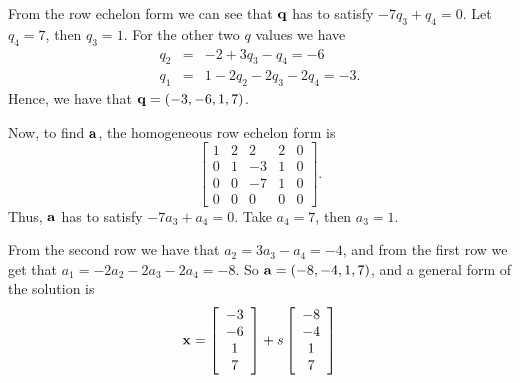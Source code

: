 From the row echelon form we can see that $\qq$ has to satisfy $- 7q_3 + q_4 = 0$. Let $q_4 = 7$, then $q_3 = 1$. For the other two $q$ values we have
\begin{eqnarray*}
  q_2 &=& -2 + 3q_3 - q_4 = -6 \\
	q_1 &=& 1 - 2q_2 - 2q_3 - 2q_4 = -3.
\end{eqnarray*}
Hence, we have that $\qq = (-3, -6, 1, 7)$.

Now, to find $\aa$, the homogeneous row echelon form is
$$
\left[\begin{array}{cccc|c}
     1 & 2 & 2 & 2 & 0 \\
		 0 & 1 & -3 & 1 & 0\\
		 0 & 0 & -7 & 1 & 0\\
		 0 & 0 & 0 & 0 & 0
      \end{array}\right].
$$
Thus, $\aa$ has to satisfy $-7a_3 + a_4 = 0$. Take $a_4 = 7$, then $a_3 = 1$.

From the second row we have that $a_2 = 3a_3 - a_4 = -4$, and from the first row we get that $a_1 = -2a_2 - 2a_3 - 2a_4 = -8$. So $\aa = (-8, -4, 1, 7)$, and a general form of the solution is
$$
\xx = \left[\begin{array}{c} -3 \\ -6 \\ 1 \\ 7 \end{array}\right] +
s\left[\begin{array}{c} -8 \\ -4 \\ 1 \\ 7 \end{array}\right]
$$

